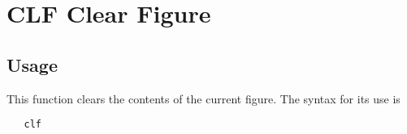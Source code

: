 \section{CLF Clear Figure}

\subsection{Usage}

This function clears the contents of the current figure.  The
syntax for its use is
\begin{verbatim}
   clf
\end{verbatim}
